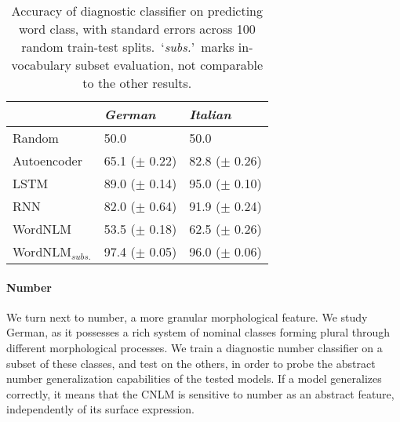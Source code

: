 \begin{table}[t]
\footnotesize
    \begin{center}
      \begin{tabular}{l|l|l}
        &\emph{German}&\emph{Italian}\\
        \hline
	      Random & 50.0 & 50.0 \\
        Autoencoder & 65.1 ($\pm$ 0.22) & 82.8 ($\pm$ 0.26) \\
	      \hline
        LSTM & 89.0 ($\pm$ 0.14) & 95.0 ($\pm$ 0.10) \\
        RNN & 82.0 ($\pm$ 0.64) & 91.9 ($\pm$ 0.24) \\
	      WordNLM & 53.5 ($\pm$ 0.18)  & 62.5 ($\pm$ 0.26) \\ \hline
	      WordNLM$_{\textit{subs.}}$ & 97.4 ($\pm$ 0.05) & 96.0 ($\pm$ 0.06) \\
      \end{tabular}
    \end{center}
	\caption{\label{tab:pos-results} Accuracy of diagnostic classifier on predicting word class, with standard errors across 100 random train-test splits.~`\emph{subs.}'~marks in-vocabulary subset evaluation, not comparable to the other results.} %
\end{table}






\paragraph{Number}
We turn next to number, a more granular morphological feature. We
study German, as it possesses a rich system of nominal classes forming
plural through different morphological processes. We train a diagnostic number
classifier on a subset of these classes, and test on the others, in order to probe the abstract number generalization capabilities of the tested models. If a
model generalizes correctly, it means that the CNLM is sensitive to number
as an abstract feature, independently of its surface expression.

